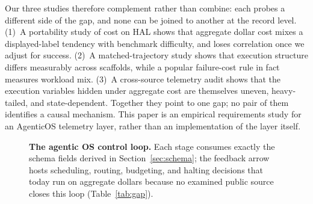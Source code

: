 \documentclass{article}
\begin{document}
Our three studies therefore complement rather than combine: each probes a different side of the gap, and none can be joined to another at the record level. (1)~A portability study of cost on HAL shows that aggregate dollar cost mixes a displayed-label tendency with benchmark difficulty, and loses correlation once we adjust for success. (2)~A matched-trajectory study shows that execution structure differs measurably across scaffolds, while a popular failure-cost rule in fact measures workload mix. (3)~A cross-source telemetry audit shows that the execution variables hidden under aggregate cost are themselves uneven, heavy-tailed, and state-dependent. Together they point to one gap; no pair of them identifies a causal mechanism. This paper is an empirical requirements study for an AgenticOS telemetry layer, rather than an implementation of the layer itself.

\begin{figure}[t]
\centering
{}
\caption{\textbf{The agentic OS control loop.} Each stage consumes exactly the schema fields derived in Section~\ref{sec:schema}; the feedback arrow hosts scheduling, routing, budgeting, and halting decisions that today run on aggregate dollars because no examined public source closes this loop (Table~\ref{tab:gap}).}
\label{fig:loop}
\end{figure}
\end{document}

